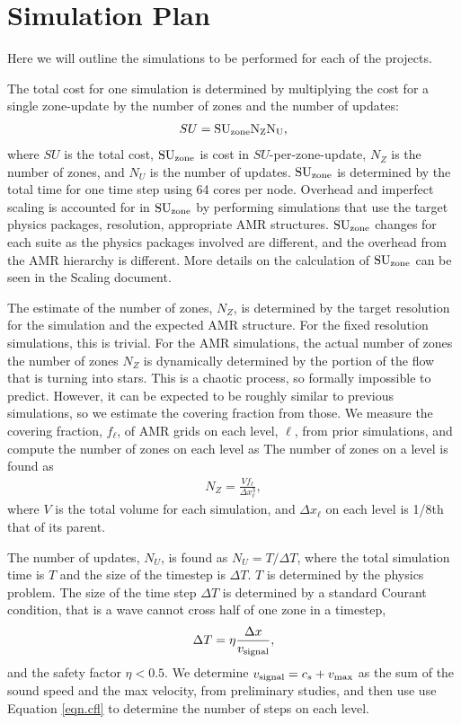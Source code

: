 \section{Simulation Plan}
\label{sec.plan}



Here we will outline the simulations to be performed for each of the projects.

The total cost for one simulation is determined by multiplying the cost for a
single zone-update by the number of zones and the number of updates:
\begin{align}
SU = \rm{SU}_{\rm{zone}} N_Z N_U,
\end{align}
where $SU$ is the total cost, $\rm{SU}_{\rm{zone}}$ is cost in
$SU$-per-zone-update, $N_Z$ is the number of zones, and $N_U$ is the number of
updates.
$\rm{SU}_{\rm{zone}}$ is determined by the total time for one time step using 64 cores per
node. Overhead and
imperfect scaling is
accounted for in $\rm{SU}_{\rm{zone}}$ by performing simulations that use the target physics
packages, resolution, appropriate AMR structures. $\rm{SU}_{\rm{zone}}$ changes for each suite as the physics packages involved are
different, and the overhead from the AMR hierarchy is different.    More details
on the calculation of $\rm{SU}_{\rm{zone}}$ can be seen in the
Scaling document.

The estimate of the number of zones, $N_Z$,
is determined by the target resolution for the simulation and the expected AMR
structure.  For the fixed
resolution simulations, this is trivial.  
For the AMR
simulations, the actual number of zones  the
number of zones $N_Z$ is dynamically determined by the portion of the flow
that is turning into stars.  This is a chaotic process, so formally impossible
to predict.
However, it can be expected to be roughly similar to
previous simulations, so we estimate the covering fraction from those.   
We measure the covering fraction, $f_\ell$, of AMR grids on each level, $\ell$,
from prior simulations, and compute the number of zones on each level as
The number of zones on a level is found as
\begin{align}
    N_Z = \frac{V f_\ell}{\Delta x_\ell^3},
\end{align}
where $V$ is the total volume for each simulation, and $\Delta x_\ell$ on each level is 1/8th that of its parent.


The number of updates, $N_U$, is found as
$N_U=T/\Delta T$, where the total simulation time is $T$ and the size of the
timestep is $\Delta T$.  $T$ is determined by the physics
problem.  The size of the time step $\Delta T$ is
determined by a standard Courant condition, that is a wave cannot cross half of
one zone in a timestep, 
\begin{align}
\Delta T = \eta \frac{\Delta
x}{v_{\rm{signal}}}, \label{eqn.cfl}
\end{align}
and the safety factor $\eta < 0.5$.  We determine $v_{\rm{signal}}=c_s+v_{\rm{max}}$
 as the sum of the sound speed and the max velocity, from preliminary studies, and then use use Equation \ref{eqn.cfl} to
determine the number of steps on each level.

